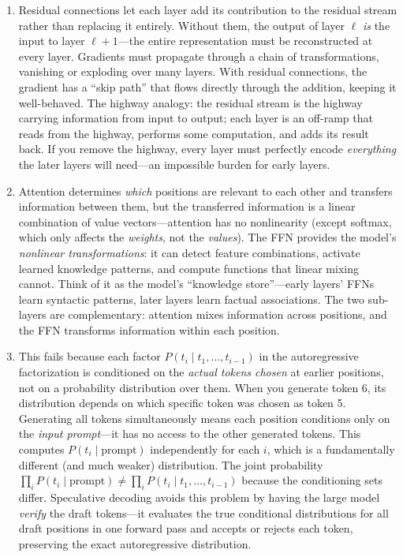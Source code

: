 \begin{enumerate}
    \item Residual connections let each layer add its contribution to the residual stream rather than replacing it entirely. Without them, the output of layer $\ell$ \emph{is} the input to layer $\ell + 1$---the entire representation must be reconstructed at every layer. Gradients must propagate through a chain of transformations, vanishing or exploding over many layers. With residual connections, the gradient has a ``skip path'' that flows directly through the addition, keeping it well-behaved. The highway analogy: the residual stream is the highway carrying information from input to output; each layer is an off-ramp that reads from the highway, performs some computation, and adds its result back. If you remove the highway, every layer must perfectly encode \emph{everything} the later layers will need---an impossible burden for early layers.

    \item Attention determines \emph{which} positions are relevant to each other and transfers information between them, but the transferred information is a linear combination of value vectors---attention has no nonlinearity (except softmax, which only affects the \emph{weights}, not the \emph{values}). The FFN provides the model's \emph{nonlinear transformations}: it can detect feature combinations, activate learned knowledge patterns, and compute functions that linear mixing cannot. Think of it as the model's ``knowledge store''---early layers' FFNs learn syntactic patterns, later layers learn factual associations. The two sub-layers are complementary: attention mixes information across positions, and the FFN transforms information within each position.

    \item This fails because each factor $P(t_i \mid t_1, \ldots, t_{i-1})$ in the autoregressive factorization is conditioned on the \emph{actual tokens chosen} at earlier positions, not on a probability distribution over them. When you generate token 6, its distribution depends on which specific token was chosen as token 5. Generating all tokens simultaneously means each position conditions only on the \emph{input prompt}---it has no access to the other generated tokens. This computes $P(t_i \mid \text{prompt})$ independently for each $i$, which is a fundamentally different (and much weaker) distribution. The joint probability $\prod_i P(t_i \mid \text{prompt}) \neq \prod_i P(t_i \mid t_1, \ldots, t_{i-1})$ because the conditioning sets differ. Speculative decoding avoids this problem by having the large model \emph{verify} the draft tokens---it evaluates the true conditional distributions for all draft positions in one forward pass and accepts or rejects each token, preserving the exact autoregressive distribution.


\end{enumerate}
